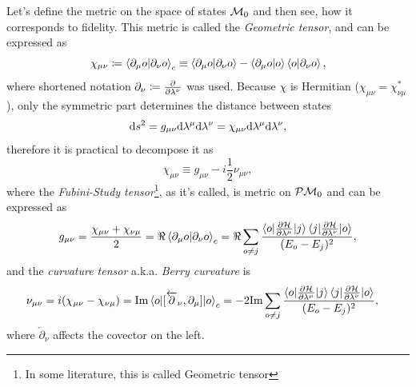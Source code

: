 Let's define the metric on the space of states $\mathcal{M}_0$ and then see, how it corresponds to fidelity. This metric is called the \emph{Geometric tensor}, and can be expressed as 
\begin{equation}
    \chi_{\mu\nu}\coloneqq \braket{\partial_\mu o|\partial_\nu o}_c \equiv \braket{\partial_\mu o|\partial_\nu o} - \braket{\partial_\mu o|o}\braket{o|\partial_\nu o},
    \label{eq:geometricTensor}
\end{equation}
where shortened notation $\partial_\nu\coloneqq\frac{\partial }{\partial \lambda^\nu}$ was used.
Because $\chi$ is Hermitian ($\chi_{\mu\nu}=\chi^*_{\nu\mu}$), only the symmetric part determines the distance between states
\begin{equation}
    \mathrm{d} s^2= g_{\mu\nu}\mathrm{d} \lambda^\mu \mathrm{d}\lambda^\nu= \chi_{\mu\nu}\mathrm{d} \lambda^\mu \mathrm{d}\lambda^\nu,
\end{equation}
therefore it is practical to decompose it as
\begin{equation}
    \chi_{\mu\nu} \equiv g_{\mu\nu} - i\frac{1}{2} \nu_{\mu\nu},
\end{equation}
where the \emph{Fubini-Study tensor}\footnote{In some literature, this is called Geometric tensor}, as it's called, is metric on $\mathcal{P}\mathcal{M}_0$ and can be expressed as
\begin{equation}
    g_{\mu\nu} = \frac{\chi_{\mu\nu}+\chi_{\nu\mu}}{2} = \Re\braket{\partial_\mu o|\partial_\nu o}_c = \Re \sum_{o\neq j}\frac{\braket{o|\frac{\partial \mathcal{H}}{\partial \lambda^\mu}|j}\braket{j|\frac{\partial \mathcal{H}}{\partial \lambda^\nu}|o}}{(E_o-E_j)^2},
    \label{eq:geom.tensorREdefinition}
\end{equation}
and the \emph{curvature tensor} a.k.a. \emph{Berry curvature} is
\begin{equation}
    \begin{split}
        \nu_{\mu\nu} = i(\chi_{\mu\nu}-\chi_{\nu\mu})&= \textrm{Im}\braket{o|[\overleftarrow{\partial}_\nu,\partial_\mu]|o}_c = -2 \textrm{Im} \sum_{o\neq j}\frac{\braket{o|\frac{\partial \mathcal{H}}{\partial \lambda^\mu}|j}\braket{j|\frac{\partial \mathcal{H}}{\partial \lambda^\nu}|o}}{(E_o-E_j)^2},
    \end{split}
\end{equation}
where $\overleftarrow{\partial}_\nu$ affects the covector on the left.


